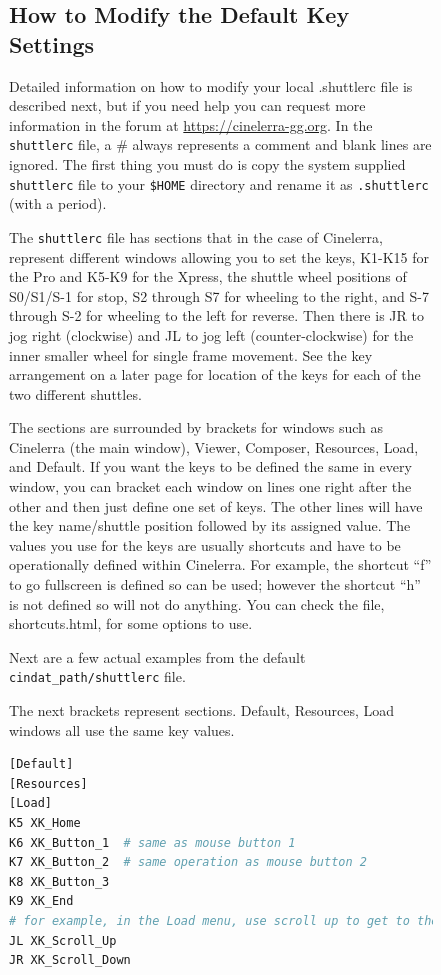 \begin{figure}
\subsection{How to Modify the Default Key Settings}%
\label{sub:modify_default_key_settings}

Detailed information on how to modify your local .shuttlerc file is described next, but if you need help you can request more information in the forum at \url{https://cinelerra-gg.org}. In the \texttt{shuttlerc} file, a \# always represents a comment and blank lines are ignored.  The first thing you must do is copy the system supplied \texttt{shuttlerc} file to your \texttt{\$HOME} directory and rename it as \texttt{.shuttlerc} (with a period). 

The \texttt{shuttlerc} file has sections that in the case of Cinelerra, represent different windows allowing you to set the keys, K1-K15 for the Pro and K5-K9 for the Xpress, the shuttle wheel positions of S0/S1/S-1 for stop, S2 through S7 for wheeling to the right, and S-7 through S-2 for wheeling to the left for reverse.  Then there is JR to jog right (clockwise) and JL to jog left (counter-clockwise) for the inner smaller wheel for single frame movement.  See the key arrangement on a later page for location of the keys for each of the two different shuttles.

The sections are surrounded by brackets for windows such as Cinelerra (the main window), Viewer, Composer, Resources, Load, and Default.  If you want the keys to be defined the same in every window, you can bracket each window on lines one right after the other and then just define one set of keys.  The other lines will have the key name/shuttle position followed by its assigned value.  The values you use for the keys are usually shortcuts and have to be operationally defined within Cinelerra. For example, the shortcut “f” to go fullscreen is defined so can be used; however the shortcut “h” is not defined so will not do anything.  You can check the file, shortcuts.html, for some options to use.

Next are a few actual examples from the default \texttt{{cindat\_path}/shuttlerc} file.

\noindent The next brackets represent sections. Default, Resources, Load windows all use the same key values.

\begin{lstlisting}[language=Bash]
[Default] 
[Resources] 
[Load] 
K5 XK_Home 
K6 XK_Button_1	# same as mouse button 1 
K7 XK_Button_2	# same operation as mouse button 2
K8 XK_Button_3 
K9 XK_End 
# for example, in the Load menu, use scroll up to get to the next file name 
JL XK_Scroll_Up	
JR XK_Scroll_Down
\end{lstlisting}


\end{figure}
